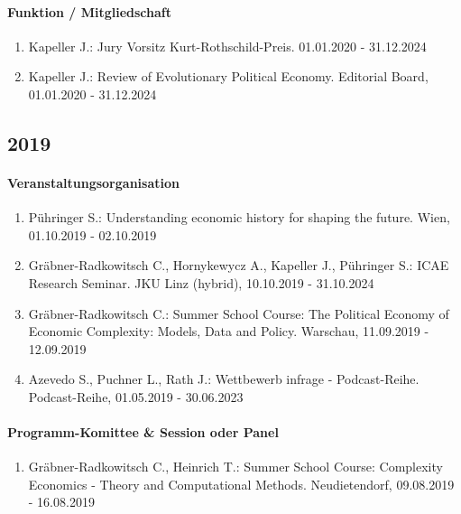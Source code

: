 \paragraph{Funktion / Mitgliedschaft}
\begin{enumerate}[leftmargin=*, labelsep=0.5cm]
\item Kapeller J.: Jury Vorsitz Kurt-Rothschild-Preis. 01.01.2020 - 31.12.2024
\item Kapeller J.: Review of Evolutionary Political Economy. Editorial Board, 01.01.2020 - 31.12.2024
\end{enumerate}
\subsection*{2019}
\paragraph{Veranstaltungsorganisation}
\begin{enumerate}[leftmargin=*, labelsep=0.5cm]
\item Pühringer S.: Understanding economic history for shaping the future. Wien, 01.10.2019 - 02.10.2019
\item Gräbner-Radkowitsch C., Hornykewycz A., Kapeller J., Pühringer S.: ICAE Research Seminar. JKU Linz (hybrid), 10.10.2019 - 31.10.2024
\item Gräbner-Radkowitsch C.: Summer School Course: The Political Economy of Economic Complexity: Models, Data and Policy. Warschau, 11.09.2019 - 12.09.2019
\item Azevedo S., Puchner L., Rath J.: Wettbewerb infrage - Podcast-Reihe. Podcast-Reihe, 01.05.2019 - 30.06.2023
\end{enumerate}

\paragraph{Programm-Komittee \& Session oder Panel}
\begin{enumerate}[leftmargin=*, labelsep=0.5cm]
\item Gräbner-Radkowitsch C., Heinrich T.: Summer School Course: Complexity Economics - Theory and Computational Methods. Neudietendorf, 09.08.2019 - 16.08.2019
\end{enumerate}

